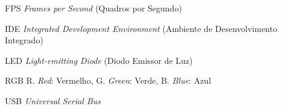 %
%

\begin{siglas}
  \setlength{\baselineskip}{0.7\baselineskip}
  
  \item[FPS] \textit{Frames per Second} (Quadros por Segundo)
  \item[IDE] \textit{Integrated Development Environment} (Ambiente de Desenvolvimento Integrado)
  \item[LED] \textit{Light-emitting Diode} (Diodo Emissor de Luz)
  \item[RGB] R. \textit{Red}: Vermelho, G. \textit{Green}: Verde, B. \textit{Blue}: Azul
  \item[USB] \textit{Universal Serial Bus}
\end{siglas}
